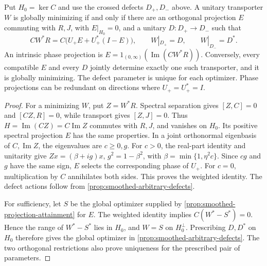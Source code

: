 \begin{theorem}
\label{thm:smoothed-all-projections-defects}
Put $H_0=\ker C$ and use the crossed defects $D_+,D_-$ above.
A unitary transporter $W$ is globally minimizing if and only if there
are an orthogonal projection $E$ commuting with $R,J$, with
$E|_{H_0}=0$, and a unitary $D:D_+\to D_-$ such that
\[
 CW^*R=C\bigl(U_+E+U_+^*(I-E)\bigr),\qquad
 W|_{D_+}=D,\qquad W|_{D_-}=D^*.
\]
An intrinsic phase projection is
$E=1_{(0,\infty)}(\operatorname{Im}(CW^*R))$.
Conversely, every compatible $E$ and every $D$ jointly determine
exactly one such transporter, and it is globally minimizing.
The defect parameter is unique for each optimizer. Phase projections
can be redundant on directions where $U_+=U_+^*=I$.
\end{theorem}

\begin{proof}
For a minimizing $W$, put $Z=W^*R$. Spectral separation gives
$[Z,C]=0$ and $[CZ,R]=0$, while transport gives $[Z,J]=0$.
Thus $H=\operatorname{Im}(CZ)=C\operatorname{Im}Z$ commutes with
$R,J$, and vanishes on $H_0$. Its positive spectral projection $E$
has the same properties. In a joint orthonormal eigenbasis of
$C,\operatorname{Im}Z$, the eigenvalues are $c\geq0,g$.
For $c>0$, the real-part identity and unitarity give
$Zx=(\beta+ig)x$, $g^2=1-\beta^2$, with
$\beta=\min\{1,\eta^2c\}$. Since $cg$ and $g$ have the same sign,
$E$ selects the corresponding phase of $U_+$. For $c=0$, multiplication
by $C$ annihilates both sides. This proves the weighted identity.
The defect actions follow from
\cref{prop:smoothed-arbitrary-defects}.

For sufficiency, let $S$ be the global optimizer supplied by
\cref{prop:smoothed-projection-attainment} for $E$. The weighted
identity implies $C(W^*-S^*)=0$. Hence the range of $W^*-S^*$ lies
in $H_0$, and $W=S$ on $H_0^\perp$. Prescribing $D,D^*$ on $H_0$
therefore gives the global optimizer in
\cref{prop:smoothed-arbitrary-defects}. The two orthogonal restrictions
also prove uniqueness for the prescribed pair of parameters.
\end{proof}


